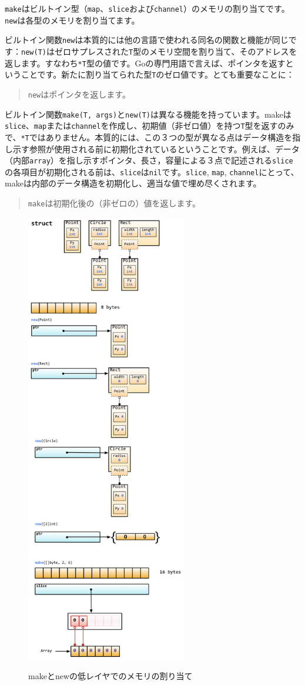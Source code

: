 \texttt{make}はビルトイン型（\texttt{map}、\texttt{slice}および\texttt{channel}）のメモリの割り当てです。\texttt{new}は各型のメモリを割り当てます。

ビルトイン関数\texttt{new}は本質的には他の言語で使われる同名の関数と機能が同じです：\texttt{new(T)}はゼロサプレスされた\texttt{T}型のメモリ空間を割り当て、そのアドレスを返します。すなわち\texttt{*T}型の値です。Goの専門用語で言えば、ポインタを返すということです。新たに割り当てられた型\texttt{T}のゼロ値です。とても重要なことに：

\begin{quote}
\texttt{new}はポインタを返します。
\end{quote}

ビルトイン関数\texttt{make(T, args)}と\texttt{new(T)}は異なる機能を持っています。makeは\texttt{slice}、\texttt{map}または\texttt{channel}を作成し、初期値（非ゼロ値）を持つ\texttt{T}型を返すのみで、\texttt{*T}ではありません。本質的には、この３つの型が異なる点はデータ構造を指し示す参照が使用される前に初期化されているということです。例えば、データ（内部\texttt{array}）を指し示すポインタ、長さ，容量による３点で記述される\texttt{slice}の各項目が初期化される前は、\texttt{slice}は\texttt{nil}です。\texttt{slice}, \texttt{map}, \texttt{channel}にとって、makeは内部のデータ構造を初期化し、適当な値で埋め尽くされます。


\begin{quote}
\texttt{make}は初期化後の（非ゼロの）値を返します。
\end{quote}




\begin{figure}[H]
  \includegraphics[width=7cm]{2.2.makenew.png}
   \label{図2.5}
   \caption{makeとnewの低レイヤでのメモリの割り当て}
\end{figure}
